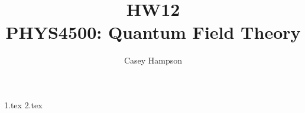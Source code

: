 \documentclass[titlepage]{article}
\title{HW12 \\[5pt] PHYS4500: Quantum Field Theory}
\author{Casey Hampson}
\begin{document}
    \maketitle
    \pagebreak

    {1.tex}
    {2.tex}
\end{document}
